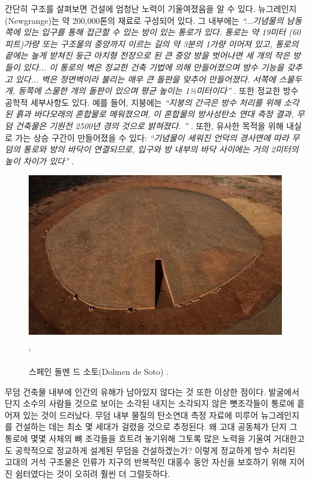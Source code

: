 \documentclass[10pt,twocolumn,letterpaper]{article}
\begin{document}
간단히 구조를 살펴보면 건설에 엄청난 노력이 기울여졌음을 알 수 있다. 뉴그레인지(Newgrange)는 약 200,000톤의 재료로 구성되어 있다. 그 내부에는 \textit{“...기념물의 남동쪽에 있는 입구를 통해 접근할 수 있는 방이 있는 통로가 있다. 통로는 약 19미터 (60피트)가량 또는 구조물의 중앙까지 이르는 길의 약 3분의 1가량 이어져 있고, 통로의 끝에는 높게 받쳐진 둥근 아치형 천장으로 된 큰 중앙 방을 벗어나면 세 개의 작은 방들이 있다... 이 통로의 벽은 정교한 건축 기법에 의해 만들어졌으며 방수 기능을 갖추고 있다... 벽은 정면벽이라 불리는 매우 큰 돌판을 맞추어 만들어졌다. 서쪽에 스물두 개, 동쪽에 스물한 개의 돌판이 있으며 평균 높이는 1½미터이다”} \cite{70}. 또한 정교한 방수 공학적 세부사항도 있다. 예를 들어, 지붕에는 \textit{“지붕의 간극은 방수 처리를 위해 소각된 흙과 바다모래의 혼합물로 메워졌으며, 이 혼합물의 방사성탄소 연대 측정 결과, 무덤 건축물은 기원전 2500년 경의 것으로 밝혀졌다. ”} \cite{71}. 또한, 유사한 목적을 위해 내실로 가는 상승 구간이 만들어졌을 수 있다: \textit{“기념물이 세워진 언덕의 경사면에 따라 무덤의 통로와 방의 바닥이 연결되므로, 입구와 방 내부의 바닥 사이에는 거의 2미터의 높이 차이가 있다”} \cite{71}.

\begin{figure}[t]
\begin{center}
   \includegraphics[width=1\linewidth]{dolmen.jpg}
\end{center}
   \caption{스페인 돌멘 드 소토(Dolmen de Soto) \cite{53}.}`
\label{fig:9}
\label{fig:onecol}
\end{figure}

무덤 건축물 내부에 인간의 유해가 남아있지 않다는 것 또한 이상한 점이다. 발굴에서 단지 소수의 사람들 것으로 보이는 소각된 내지는 소각되지 않은 뼛조각들이 통로에 흩어져 있는 것이 드러났다. 무덤 내부 물질의 탄소연대 측정 자료에 미루어 뉴그레인지를 건설하는 데는 최소 몇 세대가 걸렸을 것으로 추정된다. 왜 고대 공동체가 단지 그 통로에 몇몇 사체의 뼈 조각들을 흐트려 놓기위해  그토록 많은 노력을 기울여 거대한고도 공학적으로 정교하게 설계된 무덤을 건설하겠는가? 이렇게 정교하게 방수 처리된 고대의 거석 구조물은 인류가 지구의 반복적인 대홍수 동안 자신을 보호하기 위해 지어진 쉼터였다는 것이 오히려 훨씬 더 그럴듯하다.
\end{document}
